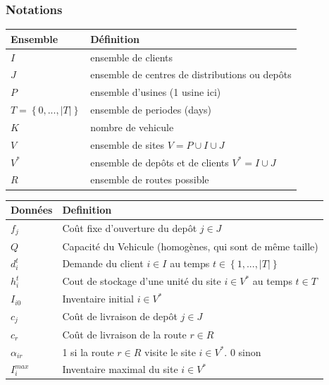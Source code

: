 \documentclass[a4paper,10pt]{article}
\begin{document}
\subsubsection{Notations}\label{notations}
\begin{tabular}{ll}
\hline
Ensemble & Définition \\
\hline
$I$ & ensemble de clients\\ 
$J$ & ensemble de centres de distributions ou depôts\\
$P$ & ensemble d'usines (1 usine ici)\\
$T=\left \{0,...,|T|\right \}$ & ensemble de periodes (days)\\
$K$ & nombre de vehicule\\
$V$ & ensemble de sites $V=P\cup I \cup J$\\
$V^*$ & ensemble de depôts et de clients $V^*=I \cup J$\\
$R$ & ensemble de routes possible\\
\hline
\end{tabular}
\newpage
\begin{tabular}{ll}
\hline
Données & Definition \\
\hline
$f_j$ & Coût fixe d'ouverture du depôt $j\in J$\\ 
$Q$ & Capacité du Vehicule (homogènes, qui sont de même taille)\\ 
$d^t_i$ & Demande du client $i \in  I$ au temps $t \in \left \{1,...,|T| \right \}$\\
$h^t_i$ & Cout de stockage d'une unité du site $i \in V^*$ au temps $t\in T$\\
$I_{i0}$ & Inventaire initial $i \in V^*$\\
$c_j$ & Coût de livraison de depôt $j\in J$ \\
$c_r$ & Coût de livraison de la route $r\in R$\\
$\alpha_{ir}$ & 1 si la route $r \in R$ visite le site $i\in V^*$. 0 sinon\\
$I^{max}_i$ & Inventaire maximal du site $i\in V^*$ \\
\hline
\end{tabular}
\end{document}
